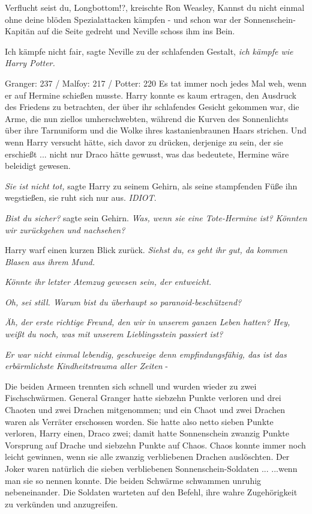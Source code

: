 \glqq{}Verflucht seist du, Longbottom!?\grqq{}, kreischte Ron Weasley, \glqq{}
Kannst du nicht einmal ohne deine blöden Spezialattacken kämpfen -\grqq{} und
schon war der Sonnenschein-Kapitän auf die Seite gedreht und Neville schoss ihm
ins Bein.

\glqq{}Ich kämpfe nicht fair\grqq{}, sagte Neville zu der schlafenden Gestalt,
\glqq{}\emph{ich kämpfe wie Harry Potter.}\grqq{}

Granger: 237 / Malfoy: 217 / Potter: 220 Es tat immer noch jedes Mal weh, wenn
er auf Hermine schießen musste. Harry konnte es kaum ertragen, den Ausdruck des
Friedens zu betrachten, der über ihr schlafendes Gesicht gekommen war, die Arme,
die nun ziellos umherschwebten, während die Kurven des Sonnenlichts über ihre
Tarnuniform und die Wolke ihres kastanienbraunen Haars strichen. Und wenn Harry
versucht hätte, sich davor zu drücken, derjenige zu sein, der sie erschießt ...
nicht nur Draco hätte gewusst, was das bedeutete, Hermine wäre beleidigt
gewesen.

\emph{Sie ist nicht tot,} sagte Harry zu seinem Gehirn, als seine stampfenden
Füße ihn wegstießen, sie ruht sich nur aus. \emph{IDIOT}.

\emph{Bist du sicher?} sagte sein Gehirn. \emph{Was, wenn sie eine Tote-Hermine
ist? Könnten wir zurückgehen und nachsehen?}

Harry warf einen kurzen Blick zurück.
\emph{Siehst du, es geht ihr gut, da kommen Blasen aus ihrem Mund.}

\emph{Könnte ihr letzter Atemzug gewesen sein, der entweicht.}

\emph{Oh, sei still. Warum bist du überhaupt so paranoid-beschützend?}

\emph{Äh, der erste richtige Freund, den wir in unserem ganzen Leben hatten?
Hey, weißt du noch, was mit unserem Lieblingsstein passiert ist?}

\emph{Er war nicht einmal lebendig, geschweige denn empfindungsfähig, das ist
das erbärmlichste Kindheitstrauma aller Zeiten} -

Die beiden Armeen trennten sich schnell und wurden wieder zu zwei
Fischschwärmen. General Granger hatte siebzehn Punkte verloren und drei Chaoten
und zwei Drachen mitgenommen; und ein Chaot und zwei Drachen waren als Verräter
erschossen worden. Sie hatte also netto sieben Punkte verloren, Harry einen,
Draco zwei; damit hatte Sonnenschein zwanzig Punkte Vorsprung auf Drache und
siebzehn Punkte auf Chaos. Chaos konnte immer noch leicht gewinnen, wenn sie
alle zwanzig verbliebenen Drachen auslöschten. Der Joker waren natürlich die
sieben verbliebenen Sonnenschein-Soldaten ... ...wenn man sie so nennen konnte.
Die beiden Schwärme schwammen unruhig nebeneinander. Die Soldaten warteten auf
den Befehl, ihre wahre Zugehörigkeit zu verkünden und anzugreifen.

